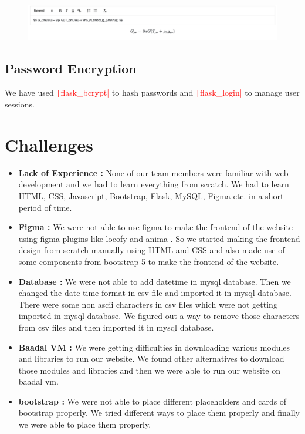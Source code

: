 \documentclass{article}
\begin{document}
\begin{figure}[h]
    \centering
    \includegraphics[width=13cm]{MathJax1.png}
    \end{figure}


\subsection{Password Encryption}
We have used \textcolor{red}{\texttt|flask_bcrypt|} to hash passwords and \textcolor{red}{\texttt|flask_login|} to manage user sessions.
\section{Challenges}
\begin{itemize}
    \item \textbf{Lack of Experience :} None of our team members were familiar with web development and we had to learn everything from scratch. We had to learn HTML, CSS, Javascript, Bootstrap, Flask, MySQL, Figma etc. in a short period of time.
    \item \textbf{Figma :} We were not able to use figma to make the frontend of the website using figma plugins like locofy and anima . So we started making the frontend design from scratch manually using HTML and CSS and also made use of some components from  bootstrap 5 to make the frontend of the website.
    \item \textbf{Database :} We were not able to add datetime in mysql database. Then we changed the date time format in csv file and imported it in mysql database. There were some non ascii characters in csv files which were not getting imported in mysql database. We figured out a way to remove those characters from csv files and then imported it in mysql database.
    \item \textbf{Baadal VM :} We were getting difficulties in downloading various modules and libraries to run our website. We found other alternatives to download those modules and libraries and then we were able to run our website on baadal vm.
    \item \textbf{bootstrap :} We were not able to place different placeholders and cards of bootstrap properly. We tried different ways to place them properly and finally we were able to place them properly.
\end{itemize}
\end{document}
